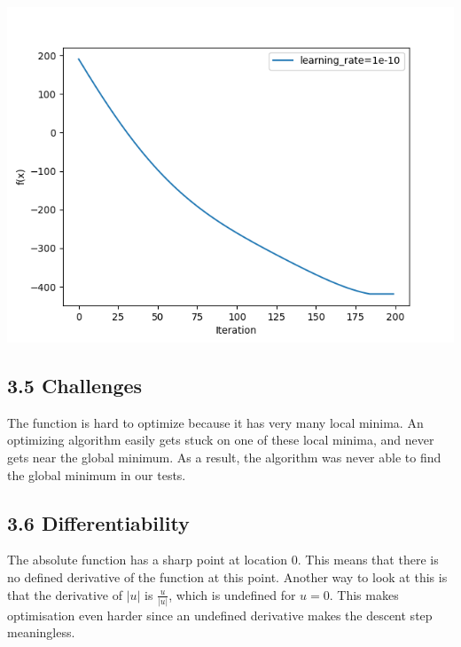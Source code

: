     \includegraphics[width=\textwidth / 2]{3_slow_learn}

    \subsection*{3.5 Challenges}
    The function is hard to optimize because it has very many local minima.
    An optimizing algorithm easily gets stuck on one of these local minima, and never gets near the global minimum.
    As a result, the algorithm was never able to find the global minimum in our tests.

    \subsection*{3.6 Differentiability}
    The absolute function has a sharp point at location $0$.
    This means that there is no defined derivative of the function at this point.
    Another way to look at this is that the derivative of $|u|$ is $\frac{u}{|u|}$, which is undefined for $u = 0$.
    This makes optimisation even harder since an undefined derivative makes the descent step meaningless.



